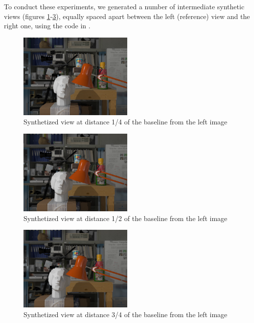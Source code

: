 To conduct these experiments, we generated a number of intermediate synthetic views (figures \ref{fig:synt1/4}-\ref{fig:synt3/4}), equally spaced apart between the left (reference) view and the right one, using the code in \cite{VS}.\newline


\begin{figure}[h!]
\centering
\includegraphics[width=0.5\textwidth]{./img/synth_view1_25.png}
\caption{\small{Synthetized view at distance 1/4 of the baseline from the left image }}
\label{fig:synt1/4}
\end{figure}
\begin{figure}[h!]
\centering
\includegraphics[width=0.5\textwidth]{./img/synth_view1_50.png}
\caption{\small{Synthetized view at distance 1/2 of the baseline from the left image }}
\label{fig:synt1/2}
\end{figure}
\begin{figure}[h!]
\centering
\includegraphics[width=0.5\textwidth]{./img/synth_view1_75.png}
\caption{\small{Synthetized view at distance 3/4 of the baseline from the left image }}
\label{fig:synt3/4}
\end{figure}

